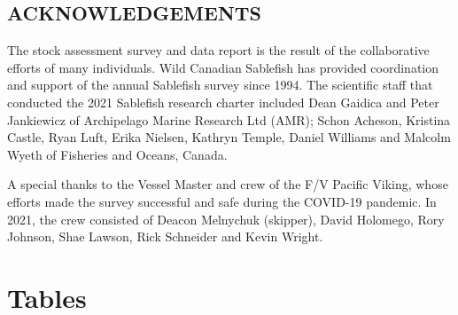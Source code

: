 \documentclass[12pt]{article}\usepackage[]{graphicx}\usepackage[]{color}
\begin{document}
\hypertarget{acknowledgements}{%
\subsection{ACKNOWLEDGEMENTS}\label{acknowledgements}}

The stock assessment survey and data report is the result of the collaborative efforts of many individuals. Wild Canadian Sablefish has provided coordination and support of the annual Sablefish survey since 1994. The scientific staff that conducted the 2021 Sablefish research charter included Dean Gaidica and Peter Jankiewicz of Archipelago Marine Research Ltd (AMR); Schon Acheson, Kristina Castle, Ryan Luft, Erika Nielsen, Kathryn Temple, Daniel Williams and Malcolm Wyeth of Fisheries and Oceans, Canada.

A special thanks to the Vessel Master and crew of the F/V Pacific Viking, whose efforts made the survey successful and safe during the COVID-19 pandemic. In 2021, the crew consisted of Deacon Melnychuk (skipper), David Holomego, Rory Johnson, Shae Lawson, Rick Schneider and Kevin Wright.

\clearpage

\hypertarget{tables}{%
\section{Tables}\label{tables}}
\end{document}
